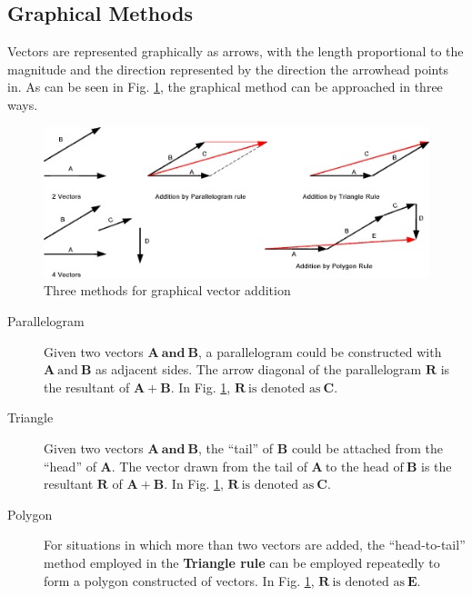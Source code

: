 \documentclass[11pt, titlepage]{article}
\begin{document}
\subsection*{Graphical Methods}
Vectors are represented graphically as arrows, with the length proportional to the magnitude and the direction represented by the direction the arrowhead points in. As can be seen in Fig. \ref{fig:1}, the graphical method can be approached in three ways.
\begin{figure}[!ht]
\centering
\includegraphics[scale=1, angle=0]{lab03_graphicvectors.jpg}
\caption{Three methods for graphical vector addition \label{fig:1}}
\end{figure} 
\begin{description}
	\item[Parallelogram] Given two vectors $\mathbf{A ~\text{and} ~B}$, a parallelogram could be constructed with $\mathbf{A} ~\text{and} ~\mathbf{B}$ as adjacent sides. The arrow diagonal of the parallelogram $\mathbf{R}$ is the resultant of $\mathbf{A} + \mathbf{B}$. In Fig. \ref{fig:1}, $\mathbf{R} ~\text{is denoted as} ~\mathbf{C}$.
	\item[Triangle] Given two vectors $\mathbf{A ~\text{and} ~B}$, the ``tail'' of $\mathbf{B}$ could be attached from the ``head'' of $\mathbf{A}$. The vector drawn from the tail of $\mathbf{A} ~\text{to the head of} ~\mathbf{B}$ is the resultant $\mathbf{R}$ of $\mathbf{A} + \mathbf{B}$. In Fig. \ref{fig:1}, $\mathbf{R} ~\text{is denoted as} ~\mathbf{C}$.
	\item[Polygon] For situations in which more than two vectors are added, the ``head-to-tail'' method employed in the \textbf{Triangle rule} can be employed repeatedly to form a polygon constructed of vectors. In Fig. \ref{fig:1}, $\mathbf{R} ~\text{is denoted as} ~\mathbf{E}$.
\end{description}
\end{document}
